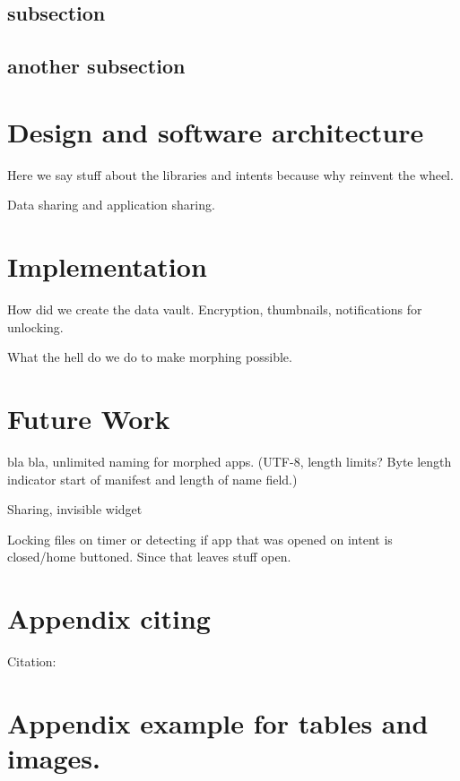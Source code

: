 \documentclass[twocolumn,english,compsoc,journal]{IEEEtran}
\begin{document}
\subsection{subsection}


\subsection{another subsection}


\section{Design and software architecture}

Here we say stuff about the libraries and intents because why reinvent
the wheel.

Data sharing and application sharing.


\section{Implementation}

How did we create the data vault. Encryption, thumbnails, notifications
for unlocking.

What the hell do we do to make morphing possible.


\section{Future Work}

bla bla, unlimited naming for morphed apps. (UTF-8, length limits?
Byte length indicator start of manifest and length of name field.)

Sharing, invisible widget

Locking files on timer or detecting if app that was opened on intent
is closed/home buttoned. Since that leaves stuff open.


\appendices{}


\section{Appendix citing}

Citation: \cite{example:beebe_archive}


\section{Appendix example for tables and images.}
\end{document}
